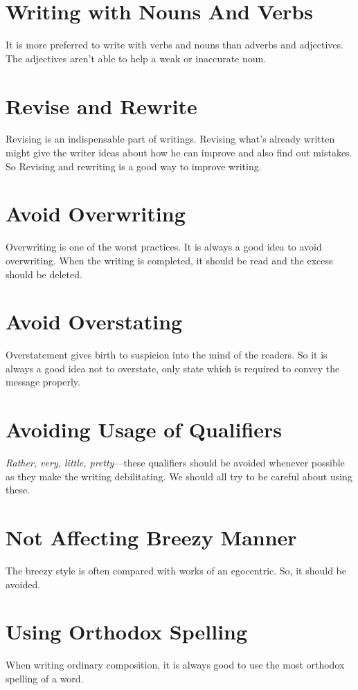 \documentclass[12pt]{report}
\begin{document}
\section{Writing with Nouns And Verbs}
It is more preferred to write with verbs and nouns than adverbs and adjectives. The adjectives aren't able to help a weak or inaccurate noun.


\section{Revise and Rewrite}
Revising is an indispensable part of writings. Revising what's already written might give the writer ideas about how he can improve and also find out mistakes. So Revising and rewriting is a good way to improve writing.


\section{Avoid Overwriting}
Overwriting is one of the worst practices. It is always a good idea to avoid overwriting. When the writing is completed, it should be read and the excess should be deleted.


\section{Avoid Overstating}
Overstatement gives birth to suspicion into the mind of the readers. So it is always a good idea not to overstate, only state which is required to convey the message properly.


\section{Avoiding Usage of Qualifiers}
\textit{Rather, very, little, pretty}---these qualifiers should be avoided whenever possible as they make the writing debilitating. We should all try to be careful about using these.


\section{Not Affecting Breezy Manner}
The breezy style is often compared with works of an egocentric. So, it should be avoided.


\section{Using Orthodox Spelling}
When writing ordinary composition, it is always good to use the most orthodox spelling of a word.
\end{document}
